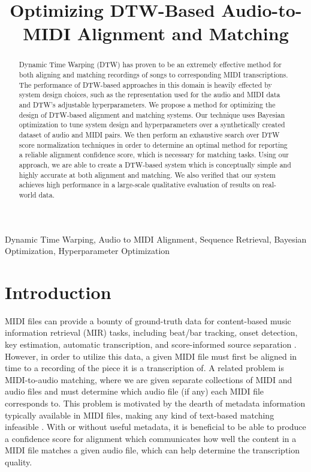 \documentclass{article}
\title{Optimizing DTW-Based Audio-to-MIDI Alignment and Matching}
\begin{document}
\maketitle

\begin{abstract}
Dynamic Time Warping (DTW) has proven to be an extremely effective method for both aligning and matching recordings of songs to corresponding MIDI transcriptions.
The performance of DTW-based approaches in this domain is heavily effected by system design choices, such as the representation used for the audio and MIDI data and DTW's adjustable hyperparameters.
We propose a method for optimizing the design of DTW-based alignment and matching systems.
Our technique uses Bayesian optimization to tune system design and hyperparameters over a synthetically created dataset of audio and MIDI pairs.
We then perform an exhaustive search over DTW score normalization techniques in order to determine an optimal method for reporting a reliable alignment confidence score, which is necessary for matching tasks.
Using our approach, we are able to create a DTW-based system which is conceptually simple and highly accurate at both alignment and matching.
We also verified that our system achieves high performance in a large-scale qualitative evaluation of results on real-world data.
\end{abstract}

\begin{keywords}
Dynamic Time Warping, Audio to MIDI Alignment, Sequence Retrieval, Bayesian Optimization, Hyperparameter Optimization
\end{keywords}

\section{Introduction}
\label{sec:intro}

MIDI files can provide a bounty of ground-truth data for content-based music information retrieval (MIR) tasks, including beat/bar tracking, onset detection, key estimation, automatic transcription, and score-informed source separation \cite{ewert2012towards, turetsky2003ground, ewert2014score, raffel2014pretty_midi}.
However, in order to utilize this data, a given MIDI file must first be aligned in time to a recording of the piece it is a transcription of.
A related problem is MIDI-to-audio matching, where we are given separate collections of MIDI and audio files and must determine which audio file (if any) each MIDI file corresponds to.
This problem is motivated by the dearth of metadata information typically available in MIDI files, making any kind of text-based matching infeasible \cite{raffel2015large}.
With or without useful metadata, it is beneficial to be able to produce a confidence score for alignment which communicates how well the content in a MIDI file matches a given audio file, which can help determine the transcription quality.
\end{document}
